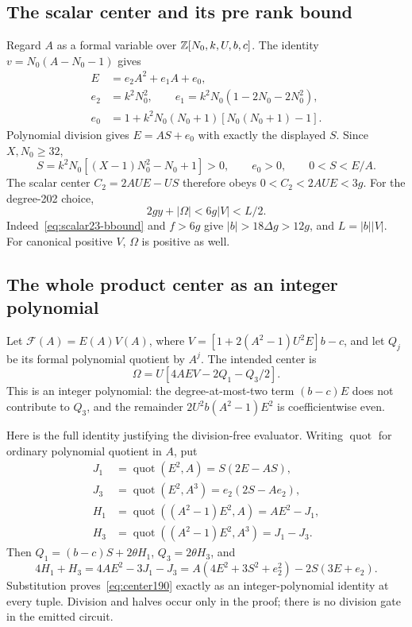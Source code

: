 \subsection{The scalar center and its pre rank bound}
Regard $A$ as a formal variable over $\mathbb Z[N_0,k,U,b,c]$. The identity
$v=N_0(A-N_0-1)$ gives
\begin{align*}
 E&=e_2A^2+e_1A+e_0,\\
 e_2&=k^2N_0^2,\qquad e_1=k^2N_0(1-2N_0-2N_0^2),\\
 e_0&=1+k^2N_0(N_0+1)[N_0(N_0+1)-1].
\end{align*}
Polynomial division gives $E=AS+e_0$ with exactly the displayed $S$.
Since $X,N_0\ge32$,
\[
 S=k^2N_0[(X-1)N_0^2-N_0+1]>0,
 \qquad e_0>0,\qquad 0<S<E/A.
\]
The scalar center $C_2=2AUE-US$ therefore obeys
$0<C_2<2AUE<3g$. For the degree-202 choice,
\[
 2gy+|\Omega|<6g|V|<L/2.
\]
Indeed~\eqref{eq:scalar23-bbound} and $f>6g$ give
$|b|>18\Delta g>12g$, and $L=|b||V|$. For canonical positive $V$,
$\Omega$ is positive as well.

\subsection{The whole product center as an integer polynomial}
Let $\mathcal F(A)=E(A)V(A)$, where
$V=[1+2(A^2-1)U^2E]b-c$, and let $Q_j$ be its formal polynomial quotient
by $A^j$. The intended center is
\begin{equation}\label{eq:whole-quotient}
 \Omega=U[4AEV-2Q_1-Q_3/2].
\end{equation}
This is an integer polynomial: the degree-at-most-two term $(b-c)E$
does not contribute to $Q_3$, and the remainder
$2U^2b(A^2-1)E^2$ is coefficientwise even.

Here is the full identity justifying the division-free evaluator.
Writing $\operatorname{quot}$ for ordinary polynomial quotient in $A$, put
\begin{align*}
 J_1&=\operatorname{quot}(E^2,A)=S(2E-AS),\\
 J_3&=\operatorname{quot}(E^2,A^3)=e_2(2S-Ae_2),\\
 H_1&=\operatorname{quot}((A^2-1)E^2,A)=AE^2-J_1,\\
 H_3&=\operatorname{quot}((A^2-1)E^2,A^3)=J_1-J_3.
\end{align*}
Then $Q_1=(b-c)S+2\theta H_1$, $Q_3=2\theta H_3$, and
\[
 4H_1+H_3
 =4AE^2-3J_1-J_3
 =A(4E^2+3S^2+e_2^2)-2S(3E+e_2).
\]
Substitution proves~\eqref{eq:center190} exactly as an integer-polynomial
identity at every tuple. Division and halves occur only in the proof;
there is no division gate in the emitted circuit.

